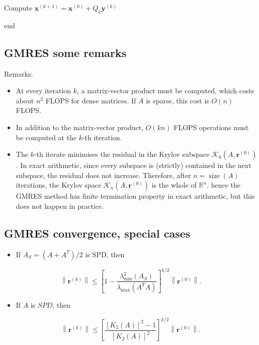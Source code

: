 \documentclass[11pt]{book}
\begin{document}
Compute $\mathbf{x}^{(k+1)}=\mathbf{x}^{(0)}+Q_{k} \mathbf{y}^{(k)}$

end

\subsection*{GMRES some remarks}
Remarks:
\begin{itemize}
  \item At every iteration $k$, a matrix-vector product must be computed, which costs about $n^{2}$ FLOPS for dense matrices. If $A$ is sparse, this cost is $O(n)$ FLOPS.

  \item In addition to the matrix-vector product, $O(k n)$ FLOPS operations must be computed at the $k$-th iteration.

  \item The $k$-th iterate minimises the residual in the Krylov subspace $\mathscr{K}_{k}\left(A, \mathbf{r}^{(0)}\right)$. In exact arithmetic, since every subspace is (strictly) contained in the next subspace, the residual does not increase. Therefore, after $n=\operatorname{size}(A)$ iterations, the Krylov space $\mathscr{K}_{n}\left(A, \mathbf{r}^{(0)}\right)$ is the whole of $\mathbb{R}^{n}$. hence the GMRES method has finite termination property in exact arithmetic, but this does not happen in practice.

\end{itemize}

\subsection*{GMRES convergence, special cases}
\begin{itemize}
  \item If $A_{S}=\left(A+A^{T}\right) / 2$ is SPD, then
\end{itemize}
$$
\left\|\mathbf{r}^{(k)}\right\| \leq\left[1-\frac{\lambda_{\min }^{2}\left(A_{S}\right)}{\lambda_{\max }\left(A^{T} A\right)}\right]^{k / 2}\left\|\mathbf{r}^{(0)}\right\|.
$$
\begin{itemize}
  \item If $A$ is $S P D$, then
\end{itemize}
$$
\left\|\mathbf{r}^{(k)}\right\| \leq\left[\frac{\left[K_{2}(A)\right]^{2}-1}{\left[K_{2}(A)\right]^{2}}\right]^{k / 2}\left\|\mathbf{r}^{(0)}\right\|.
$$
\end{document}
